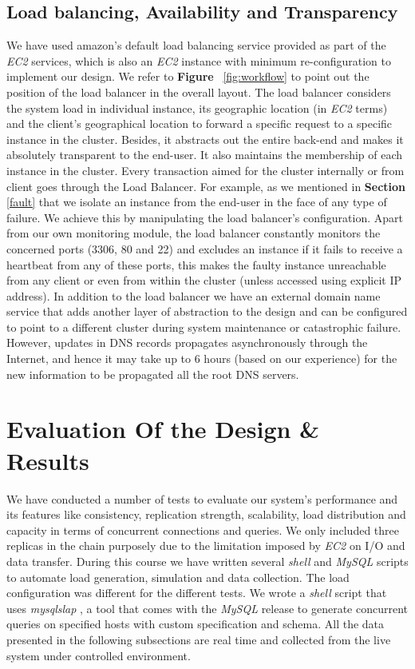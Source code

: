 \documentclass[12pt]{article}
\begin{document}
\subsection{Load balancing, Availability and Transparency}\label{lb.a.t}
We have used amazon's default load balancing service provided as part of the \emph{EC2} services, which is also an \emph{EC2} instance with minimum re-configuration to implement our design. We refer to \textbf{Figure }~\ref{fig:workflow} to point out the position of the load balancer in the overall layout. The load balancer considers the system load in individual instance, its geographic location (in \emph{EC2} terms) and the client's geographical location to forward a specific request to a specific instance in the cluster. Besides, it abstracts out the entire back-end and makes it absolutely transparent to the end-user. It also maintains the membership of each instance in the cluster. Every transaction aimed for the cluster internally or from client goes through the Load Balancer. For example, as we mentioned in \textbf{Section } \ref{fault} that we isolate an instance from the end-user in the face of any type of failure. We achieve this by manipulating the load balancer's configuration. Apart from our own monitoring module, the load balancer constantly monitors the concerned ports (3306, 80 and 22) and excludes an instance if it fails to receive a heartbeat from any of these ports, this makes the faulty instance unreachable from any client or even from within the cluster (unless accessed using explicit IP address). In addition to the load balancer we have an external domain name service that adds another layer of abstraction to the design and can be configured to point to a different cluster during system maintenance or catastrophic failure. However, updates in DNS records propagates asynchronously through the Internet, and hence it may take up to 6 hours (based on our experience) for the new information to be propagated all the root DNS servers.

\section{Evaluation Of the Design \& Results}
We have conducted a number of tests to evaluate our system's performance and its features like consistency, replication strength, scalability, load distribution and capacity in terms of concurrent connections and queries. We only included three replicas in the chain purposely due to the limitation imposed by \emph{EC2} \cite{freetier} on I/O and data transfer. During this course we have written several \emph{shell} and \emph{MySQL} scripts to automate load generation, simulation and data collection. The load configuration was different for the different tests. We wrote a \emph{shell} script that uses \emph{mysqlslap} \cite{mysqlslap}, a tool that comes with the \emph{MySQL} release to generate concurrent queries on specified hosts with custom specification and schema. All the data presented in the following subsections are real time and collected from the live system under controlled environment.
\end{document}

